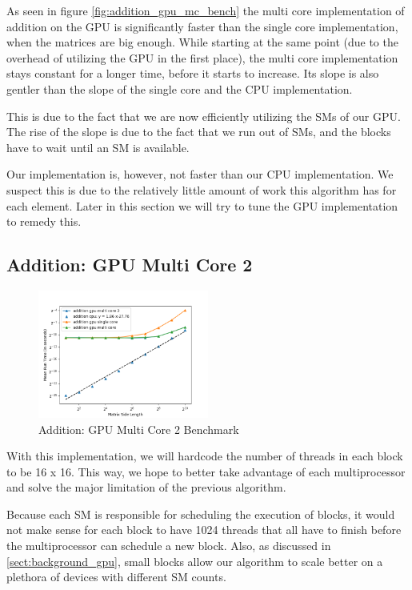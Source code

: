 As seen in figure \ref{fig:addition_gpu_mc_bench} the multi core implementation of addition on the GPU is significantly faster than the single core implementation, when the matrices are big enough. While starting at the same point (due to the overhead of utilizing the GPU in the first place), the multi core implementation stays constant for a longer time, before it starts to increase. Its slope is also gentler than the slope of the single core and the CPU implementation.

This is due to the fact that we are now efficiently utilizing the SMs of our GPU. The rise of the slope is due to the fact that we run out of SMs, and the blocks have to wait until an SM is available.

Our implementation is, however, not faster than our CPU implementation. We suspect this is due to the relatively little amount of work this algorithm has for each element. Later in this section we will try to tune the GPU implementation to remedy this.

\subsection{Addition: GPU Multi Core 2}

\begin{figure}
    \centering
    \includegraphics[width=0.5\textwidth]{SavedBenchmarksAndDiagrams/Machine 2/Addition/CPU, GPU SC, GPU MC 1, GPU MC 2.png}
    \caption{Addition: GPU Multi Core 2 Benchmark}
    \label{fig:addition_gpu_mc_2_bench}
\end{figure}

With this implementation, we will hardcode the number of threads in each block to be 16 x 16. This way, we hope to better take advantage of each multiprocessor and solve the major limitation of the previous algorithm.

Because each SM is responsible for scheduling the execution of blocks, it would not make sense for each block to have 1024 threads that all have to finish before the multiprocessor can schedule a new block. Also, as discussed in \ref{sect:background_gpu}, small blocks allow our algorithm to scale better on a plethora of devices with different SM counts.

